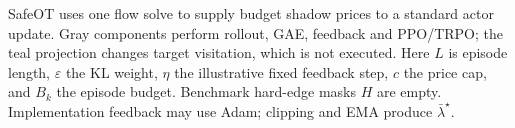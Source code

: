 SafeOT uses one flow solve to supply budget shadow prices to a standard actor update. Gray components perform rollout, GAE, feedback and PPO/TRPO; the teal projection changes target visitation, which is not executed. Here $L$ is episode length, $\varepsilon$ the KL weight, $\eta$ the illustrative fixed feedback step, $c$ the price cap, and $B_k$ the episode budget. Benchmark hard-edge masks $H$ are empty. Implementation feedback may use Adam; clipping and EMA produce $\bar\lambda^\star$.
